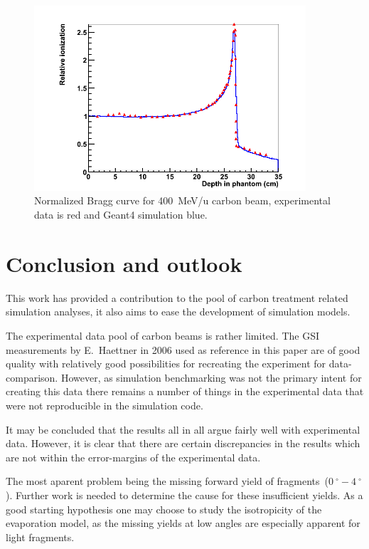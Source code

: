\begin{figure}[h] 
\begin{center}
\includegraphics[width=0.9\textwidth]{images/plots/braggPeak/braggPeakComparisonToData.png}  
\caption{\label{fig:braggPeakCompared} Normalized Bragg curve for 400~MeV/u carbon beam, experimental data is red and Geant4 simulation blue.}
 \end{center}
 \end{figure}

\clearpage
\section{Conclusion and outlook}
This work has provided a contribution to the pool of carbon treatment related simulation analyses, it also aims to ease the development of simulation models.

The experimental data pool of carbon beams is rather limited. The GSI measurements by E.~Haettner in 2006 used as reference in this paper are of good quality with relatively good possibilities for recreating the experiment for data-comparison. However, as simulation benchmarking was not the primary intent for creating this data there remains a number of things in the experimental data that were not reproducible in the simulation code.

It may be concluded that the results all in all argue fairly well with experimental data. However, it is clear that there are certain discrepancies in the results which are not within the error-margins of the experimental data.

The most aparent problem being the missing forward yield of fragments~($0~^\circ-4~^\circ$). Further work is needed to determine the cause for these insufficient yields. As a good starting hypothesis one may choose to study the isotropicity of the evaporation model, as the missing yields at low angles are especially apparent for light fragments.

